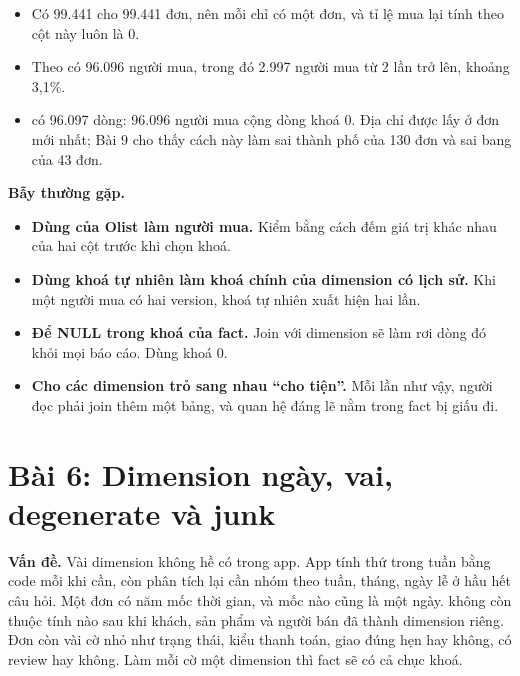 \begin{itemize}
  \item Có 99.441  cho 99.441 đơn, nên mỗi  chỉ có một đơn, và tỉ lệ mua lại tính theo cột này luôn là 0.
  \item Theo  có 96.096 người mua, trong đó 2.997 người mua từ 2 lần trở lên, khoảng 3,1\%.
  \item {} có 96.097 dòng: 96.096 người mua cộng dòng khoá 0. Địa chỉ được lấy ở đơn mới nhất; Bài 9 cho thấy cách này làm sai thành phố của 130 đơn và sai bang của 43 đơn.
\end{itemize}

\begin{luuy}
\textbf{Bẫy thường gặp.}
\begin{itemize}
  \item \textbf{Dùng  của Olist làm người mua.} Kiểm bằng cách đếm giá trị khác nhau của hai cột trước khi chọn khoá.
  \item \textbf{Dùng khoá tự nhiên làm khoá chính của dimension có lịch sử.} Khi một người mua có hai version, khoá tự nhiên xuất hiện hai lần.
  \item \textbf{Để NULL trong khoá của fact.} Join với dimension sẽ làm rơi dòng đó khỏi mọi báo cáo. Dùng khoá 0.
  \item \textbf{Cho các dimension trỏ sang nhau ``cho tiện''.} Mỗi lần như vậy, người đọc phải join thêm một bảng, và quan hệ đáng lẽ nằm trong fact bị giấu đi.
\end{itemize}
\end{luuy}

\section{Bài 6: Dimension ngày, vai, degenerate và junk}

\textbf{Vấn đề.} Vài dimension không hề có trong app. App tính thứ trong tuần bằng code mỗi khi cần, còn phân tích lại cần nhóm theo tuần, tháng, ngày lễ ở hầu hết câu hỏi. Một đơn có năm mốc thời gian, và mốc nào cũng là một ngày.  không còn thuộc tính nào sau khi khách, sản phẩm và người bán đã thành dimension riêng. Đơn còn vài cờ nhỏ như trạng thái, kiểu thanh toán, giao đúng hẹn hay không, có review hay không. Làm mỗi cờ một dimension thì fact sẽ có cả chục khoá.

